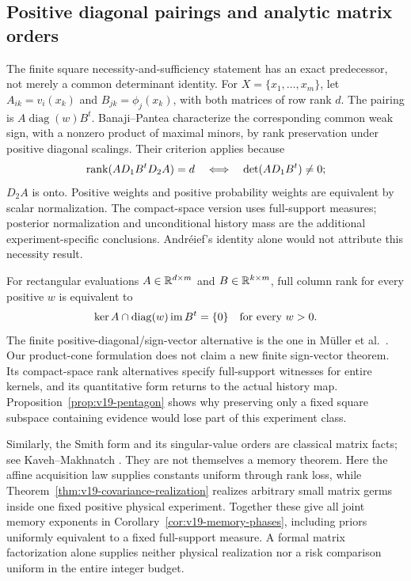 \subsection{Positive diagonal pairings and analytic matrix orders}
\label{sec:v19-comparison}
The finite square necessity-and-sufficiency statement has an exact
predecessor, not merely a common determinant identity. For
$X=\{x_1,\ldots,x_m\}$, let
$A_{ik}=v_i(x_k)$ and $B_{jk}=\phi_j(x_k)$, with both matrices of
row rank $d$. The pairing is $A\operatorname{diag}(w)B^t$.
Banaji--Pantea \cite[Definition 2.24 and Lemma 2.36]{BanajiPantea2016}
characterize the corresponding common weak sign, with a nonzero
product of maximal minors, by rank preservation under positive
diagonal scalings. Their criterion applies because
\[
 \operatorname{rank}(AD_1B^tD_2A)=d
       \quad\Longleftrightarrow\quad\det(AD_1B^t)\ne0;
\]
$D_2A$ is onto. Positive weights and positive probability weights
are equivalent by scalar normalization. The compact-space version
uses full-support measures; posterior normalization and unconditional
history mass are the additional experiment-specific conclusions.
Andr\'eief's identity alone would not attribute this necessity result.

For rectangular evaluations $A\in\mathbb R^{d\times m}$ and
$B\in\mathbb R^{k\times m}$, full column rank for every positive $w$ is
equivalent to
\[
 \ker A\cap\operatorname{diag}(w)\operatorname{im}B^t=\{0\}
                     \quad\hbox{for every }w>0.
\]
The finite positive-diagonal/sign-vector alternative is the one in
M\"uller et al.\ \cite[Lemma 2.1]{MullerEtAl2016}. Our product-cone
formulation does not claim a new finite sign-vector theorem. Its
compact-space rank alternatives specify full-support witnesses for
entire kernels, and its quantitative form returns to the actual
history map. Proposition~\ref{prop:v19-pentagon} shows why preserving
only a fixed square subspace containing evidence would lose part of
this experiment class.

Similarly, the Smith form and its singular-value orders are classical
matrix facts; see Kaveh--Makhnatch \cite[Theorem 1.1]{KavehMakhnatch}.
They are not themselves a memory theorem. Here the affine acquisition
law supplies constants uniform through rank loss, while
Theorem~\ref{thm:v19-covariance-realization} realizes arbitrary small
matrix germs inside one fixed positive physical experiment. Together
these give all joint memory exponents in
Corollary~\ref{cor:v19-memory-phases}, including priors uniformly
equivalent to a fixed full-support measure. A formal matrix
factorization alone supplies neither physical realization nor a risk
comparison uniform in the entire integer budget.
